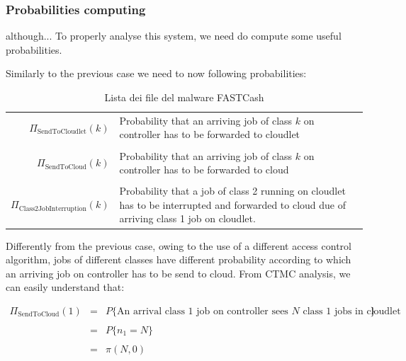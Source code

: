 \documentclass[10pt,a4paper]{article}
\begin{document}
\subsubsection{Probabilities computing}

although... To properly analyse this system, we need do compute some useful probabilities.

Similarly to the previous case we need to now following probabilities:



\begin{table}[h!]
    \caption{Lista dei file del malware FASTCash}
    \centering
    \small
    \label{tab:MalwareFileList}
     \begin{tabular}{rp{8cm}}

      \toprule

      $\Pi_{\text{SendToCloudlet}}(k)$ & Probability that an arriving job of class $k$ on controller has to be forwarded to cloudlet \\
\\
      $\Pi_{\text{SendToCloud}}(k)$ & Probability that an arriving job of class $k$ on controller has to be forwarded to cloud \\
\\
      $\Pi_{\text{Class2JobInterruption}}(k)$ & Probability that a job of class 2 running on cloudlet has to be interrupted and forwarded to cloud due of  arriving class 1 job on cloudlet. \\

      \bottomrule

    \end{tabular}
\end{table}

Differently from the previous case, owing to the use of a different access control algorithm, jobs of different classes have different probability according to which an arriving job on controller has to be send to cloud. From CTMC analysis, we can easily understand that:


\begin{equation}
\begin{array} {lcl} 
\Pi_{\text{SendToCloud}}(1) & = & P\lbrace{\text{An arrival class 1 job on controller sees $N$ class 1 jobs in cloudlet}}\rbrace \\ 
\\
& = & P\lbrace{n_1 = N}\rbrace \\ 
\\
& = & \pi(N,0)
\end{array}
\end{equation}
\end{document}
